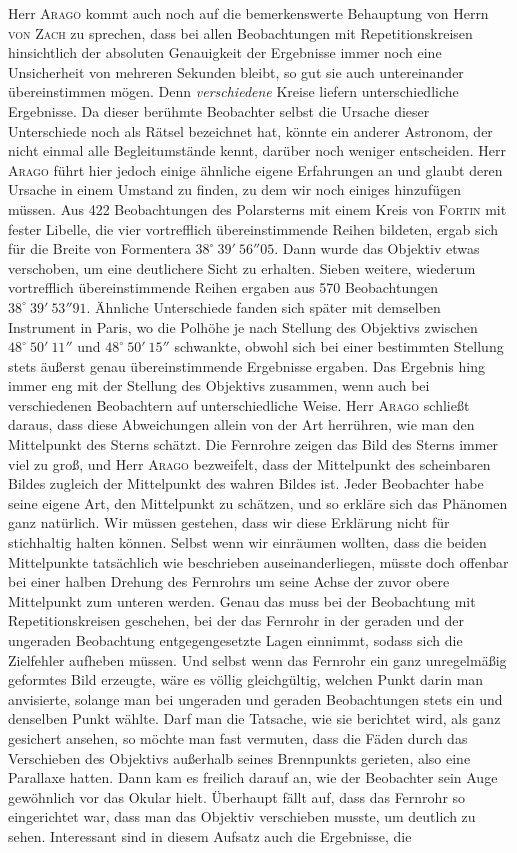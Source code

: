 Herr \textsc{Arago} kommt auch noch auf die bemerkenswerte Behauptung von Herrn \textsc{von Zach} zu sprechen, dass bei allen Beobachtungen mit Repetitionskreisen hinsichtlich der absoluten Genauigkeit der Ergebnisse immer noch eine Unsicherheit von mehreren Sekunden bleibt, so gut sie auch untereinander übereinstimmen mögen. Denn \emph{verschiedene} Kreise liefern unterschiedliche Ergebnisse. Da dieser berühmte Beobachter selbst die Ursache dieser Unterschiede noch als Rätsel bezeichnet hat, könnte ein anderer Astronom, der nicht einmal alle Begleitumstände kennt, darüber noch weniger entscheiden. Herr \textsc{Arago} führt hier jedoch einige ähnliche eigene Erfahrungen an und glaubt deren Ursache in einem Umstand zu finden, zu dem wir noch einiges hinzufügen müssen. Aus 422 Beobachtungen des Polarsterns mit einem Kreis von \textsc{Fortin} mit fester Libelle, die vier vortrefflich übereinstimmende Reihen bildeten, ergab sich für die Breite von Formentera $38^\circ\ 39'\ 56''05$. Dann wurde das Objektiv etwas verschoben, um eine deutlichere Sicht zu erhalten. Sieben weitere, wiederum vortrefflich übereinstimmende Reihen ergaben aus 570 Beobachtungen $38^\circ\ 39'\ 53''91$. Ähnliche Unterschiede fanden sich später mit demselben Instrument in Paris, wo die Polhöhe je nach Stellung des Objektivs zwischen $48^\circ\ 50'\ 11''$ und $48^\circ\ 50'\ 15''$ schwankte, obwohl sich bei einer bestimmten Stellung stets äußerst genau übereinstimmende Ergebnisse ergaben. Das Ergebnis hing immer eng mit der Stellung des Objektivs zusammen, wenn auch bei verschiedenen Beobachtern auf unterschiedliche Weise. Herr \textsc{Arago} schließt daraus, dass diese Abweichungen allein von der Art herrühren, wie man den Mittelpunkt des Sterns schätzt. Die Fernrohre zeigen das Bild des Sterns immer viel zu groß, und Herr \textsc{Arago} bezweifelt, dass der Mittelpunkt des scheinbaren Bildes zugleich der Mittelpunkt des wahren Bildes ist. Jeder Beobachter habe seine eigene Art, den Mittelpunkt zu schätzen, und so erkläre sich das Phänomen ganz natürlich. Wir müssen gestehen, dass wir diese Erklärung nicht für stichhaltig halten können. Selbst wenn wir einräumen wollten, dass die beiden Mittelpunkte tatsächlich wie beschrieben auseinanderliegen, müsste doch offenbar bei einer halben Drehung des Fernrohrs um seine Achse der zuvor obere Mittelpunkt zum unteren werden. Genau das muss bei der Beobachtung mit Repetitionskreisen geschehen, bei der das Fernrohr in der geraden und der ungeraden Beobachtung entgegengesetzte Lagen einnimmt, sodass sich die Zielfehler aufheben müssen. Und selbst wenn das Fernrohr ein ganz unregelmäßig geformtes Bild erzeugte, wäre es völlig gleichgültig, welchen Punkt darin man anvisierte, solange man bei ungeraden und geraden Beobachtungen stets ein und denselben Punkt wählte. Darf man die Tatsache, wie sie berichtet wird, als ganz gesichert ansehen, so möchte man fast vermuten, dass die Fäden durch das Verschieben des Objektivs außerhalb seines Brennpunkts gerieten, also eine Parallaxe hatten. Dann kam es freilich darauf an, wie der Beobachter sein Auge gewöhnlich vor das Okular hielt. Überhaupt fällt auf, dass das Fernrohr so eingerichtet war, dass man das Objektiv verschieben musste, um deutlich zu sehen. Interessant sind in diesem Aufsatz auch die Ergebnisse, die 
